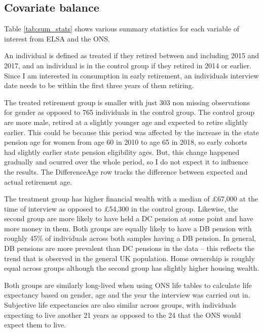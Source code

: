 \documentclass[12pt]{article}
\begin{document}


\subsection{Covariate balance}

Table \ref{tab:sum_stats} shows various summary statistics for each variable of
interest from ELSA and the ONS.

An individual is defined as treated if they retired between and including 2015
and 2017, and an individual is in the control group if they retired in 2014 or
earlier. Since I am interested in consumption in early retirement, an
individuals interview date needs to be within the first three years of them
retiring.

The treated retirement group is smaller with just 303 non missing observations
for gender as opposed to 765 individuals in the control group. The control group
are more male, retired at a slightly younger age and expected to retire slightly
earlier. This could be because this period was affected by the increase in the
state pension age for women from age 60 in 2010 to age 65 in 2018, so early
cohorts had slightly earlier state pension eligibility ages. But, this change
happened gradually and ocurred over the whole period, so I do not expect it to
influence the results. The DifferenceAge row tracks the difference between
expected and actual retirement age.

The treatment group has higher financial wealth with a median of £67,000 at the
time of interview as opposed to £54,300 in the control group. Likewise, the
second group are more likely to have held a DC pension at some point and have
more money in them. Both groups are equally likely to have a DB pension with
roughly 45\% of individuals across both samples having a DB pension. In general,
DB pensions are more prevalent than DC pensions in the data -- this reflects the
trend that is observed in the general UK population. Home ownership is roughly
equal across groups although the second group has slightly higher housing
wealth.

Both groups are similarly long-lived when using ONS life tables to calculate
life expectancy based on gender, age and the year the interview was carried out
in. Subjective life expectancies are also similar across groups, with
individuals expecting to live another 21 years as opposed to the 24 that the ONS
would expect them to live.
\end{document}
